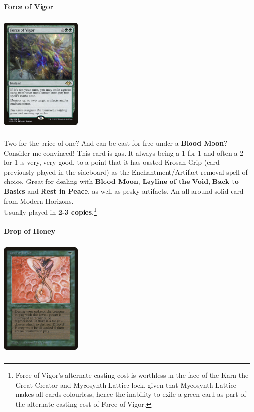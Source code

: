\documentclass{report}
\begin{document}
\textbf{Force of Vigor\\}
\begin{center}
\includegraphics [width = 4cm, height = 6cm] {force-of-vigor}
\end{center}
Two for the price of one? And can be cast for free under a \textbf{Blood Moon}? Consider me convinced! This card is gas. It always being a 1 for 1 and often a 2 for 1 is very, very good, to a point that it has ousted Krosan Grip (card previously played in the sideboard) as the Enchantment/Artifact removal spell of choice. Great for dealing with \textbf{Blood Moon}, \textbf{Leyline of the Void}, \textbf{Back to Basics} and \textbf{Rest in Peace}, as well as pesky artifacts. An all around solid card from Modern Horizons.\\Usually played in \textbf{2-3 copies}.\footnote{Force of Vigor's alternate casting cost is worthless in the face of the Karn the Great Creator and Mycosynth Lattice lock, given that Mycosynth Lattice makes all cards colourless, hence the inability to exile a green card as part of the alternate casting cost of Force of Vigor.}\\\\
\textbf{Drop of Honey\\}
\begin{center}
\includegraphics [width = 4cm, height = 6cm] {drop-of-honey}
\end{center}
\end{document}
